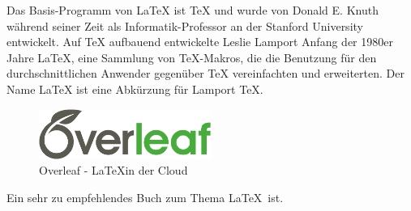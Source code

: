 Das Basis-Programm von LaTeX ist TeX und wurde von Donald E. Knuth während seiner Zeit als Informatik-Professor an der Stanford University entwickelt. Auf TeX aufbauend entwickelte Leslie Lamport\cite{Lamport2017} Anfang der 1980er Jahre LaTeX, eine Sammlung von TeX-Makros, die die Benutzung für den durchschnittlichen Anwender gegenüber TeX vereinfachten und erweiterten. Der Name LaTeX ist eine Abkürzung für Lamport TeX.

\begin{figure}[h!]
\centering
  \includegraphics[width=0.5\textwidth]{./Bilder/overleaf.png}
  \caption{Overleaf - \LaTeX in der Cloud}
\end{figure}

Ein sehr zu empfehlendes Buch zum Thema \LaTeX\ ist\cite{Kottwitz2011}. 
